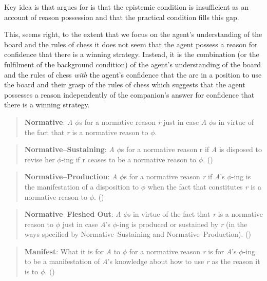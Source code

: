 \documentclass[10pt]{article}
\begin{document}
Key idea is that \citeauthor{Lord:2018aa} argues for is that the epistemic condition is insufficient as an account of reason possession and that the practical condition fills this gap.

This, seems right, to the extent that we focus on the agent's understanding of the board and the rules of chess it does not seem that the agent possess a reason for confidence that there is a winning strategy.
Instead, it is the combination (or the fulfilment of the background condition) of the agent's understanding of the board and the rules of chess \emph{with} the agent's confidence that the are in a position to use the board and their grasp of the rules of chess which suggests that the agent possesses a reason independently of the companion's answer for confidence that there is a winning strategy.

\begin{quote}
  \textbf{Normative}: \emph{A} \(\phi\)s for a normative reason \emph{r} just in case \emph{A} \(\phi\)s in virtue of the fact that \emph{r} is a normative reason to \(\phi\).
\end{quote}

\begin{quote}
  \textbf{Normative–Sustaining}: \emph{A} \(\phi\)s for a normative reason r if \emph{A} is disposed to revise her \(\phi\)-ing if r ceases to be a normative reason to \(\phi\).\nolinebreak
  \mbox{}\hfill\mbox{(\citeyear[138]{Lord:2018aa})}
\end{quote}

\begin{quote}
  \textbf{Normative–Production}: \emph{A} \(\phi\)s for a normative reason \emph{r} if \emph{A}'s \(\phi\)-ing is the manifestation of a disposition to \(\phi\) when the fact that constitutes \emph{r} is a normative reason to \(\phi\).\nolinebreak
  \mbox{}\hfill\mbox{(\citeyear[139]{Lord:2018aa})}
\end{quote}

\begin{quote}
  \textbf{Normative–Fleshed Out}: \emph{A} \(\phi\)s in virtue of the fact that \emph{r} is a normative reason to \(\phi\) just in case \emph{A}'s \(\phi\)-ing is produced or sustained by \emph{r} (in the ways specified by Normative–Sustaining and Normative–Production).\nolinebreak
  \mbox{}\hfill\mbox{(\citeyear[139]{Lord:2018aa})}
\end{quote}

\begin{quote}
  \textbf{Manifest}: What it is for \emph{A} to \(\phi\) for a normative reason \emph{r} is for \emph{A}'s \(\phi\)-ing to be a manifestation of \emph{A}'s knowledge about how to use \emph{r} as the reason it is to \(\phi\).\nolinebreak
  \mbox{}\hfill\mbox{(\citeyear[139]{Lord:2018aa})}
\end{quote}
\end{document}
